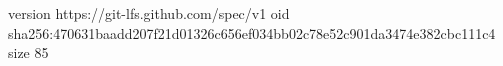 version https://git-lfs.github.com/spec/v1
oid sha256:470631baadd207f21d01326c656ef034bb02c78e52c901da3474e382cbc111c4
size 85
